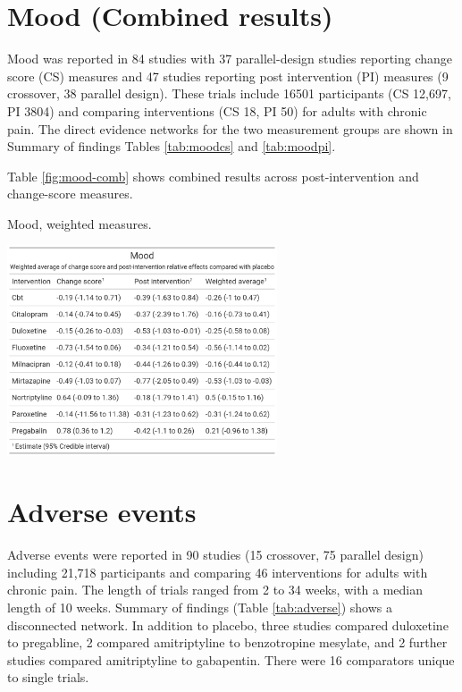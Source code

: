 \documentclass{report}\usepackage[]{graphicx}\usepackage[]{color}
\begin{document}
\section{Mood (Combined results)}

Mood was reported in 84 studies with 37 parallel-design studies reporting change score (CS) measures and 47 studies reporting post intervention (PI) measures (9 crossover, 38 parallel design). These trials include 16501 participants (CS 12,697, PI 3804) and comparing interventions (CS 18, PI 50) for adults with chronic pain. The direct evidence networks for the two measurement groups are shown in Summary of findings Tables \ref{tab:moodcs} and \ref{tab:moodpi}.

Table \ref{fig:mood-comb} shows combined results across post-intervention and change-score measures.

\begin{table}
\centering
\caption{Mood, weighted measures.}
\label{fig:mood-comb}
\includegraphics[width=0.6\textwidth]{img/mood-combined.png}
\end{table}

\section{Adverse events}


Adverse events were reported in 90 studies (15 crossover, 75 parallel design) including 21,718 participants and comparing 46 interventions for adults with chronic pain. The length of trials ranged from 2 to 34 weeks, with a median length of 10 weeks. Summary of findings (Table \ref{tab:adverse}) shows a disconnected network. In addition to placebo, three studies compared duloxetine to pregabline, 2 compared amitriptyline to benzotropine mesylate, and 2 further studies compared amitriptyline to gabapentin. There were 16 comparators unique to single trials.
\end{document}
